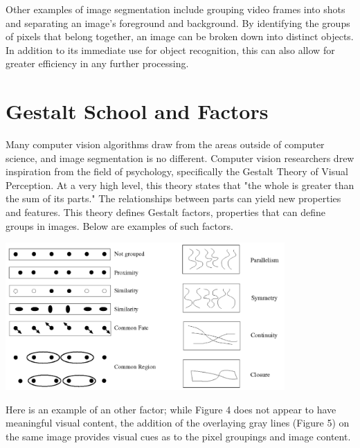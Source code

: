 \documentclass{article}
\begin{document}
Other examples of image segmentation include grouping video frames into shots and separating an image's foreground and background. By identifying the groups of pixels that belong together, an image can be broken down into distinct objects. In addition to its immediate use for object recognition, this can also allow for greater efficiency in any further processing.


\section{Gestalt School and Factors}
Many computer vision algorithms draw from the areas outside of computer science, and image segmentation is no different. Computer vision researchers drew inspiration from the field of psychology, specifically the Gestalt Theory of Visual Perception. At a very high level, this theory states that "the whole is greater than the sum of its parts." The relationships between parts can yield new properties and features. This theory defines Gestalt factors, properties that can define groups in images. Below are examples of such factors.

\begin{center}
\includegraphics[width=0.8\textwidth]{gestalt-factors.png}
\end{center}

Here is an example of an other factor; while Figure 4 does not appear to have meaningful visual content, the addition of the overlaying gray lines  (Figure 5) on the same image provides visual cues as to the pixel groupings and image content.
\end{document}
